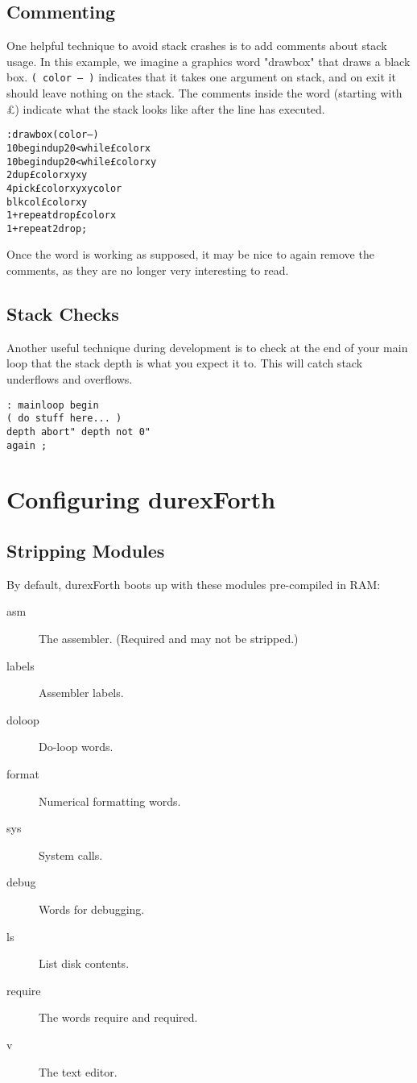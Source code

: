 \subsection{Commenting}

One helpful technique to avoid stack crashes is to add comments about stack usage.
In this example, we imagine a graphics word "drawbox" that draws a black box.
\texttt{( color -- )} indicates that it takes one argument on stack, and on exit it should
leave nothing on the stack. The comments inside the word (starting with \pounds) indicate what the stack
looks like after the line has executed.

\begin{alltt}
: drawbox ( color -- )
10 begin dup 20 < while \pounds color x
10 begin dup 20 < while \pounds color x y
2dup \pounds color x y x y
4 pick \pounds color x y x y color
blkcol \pounds color x y
1+ repeat drop \pounds color x
1+ repeat 2drop ;
\end{alltt}

Once the word is working as supposed, it may be nice to again remove the comments, as
they are no longer very interesting to read.

\subsection{Stack Checks}

Another useful technique during development is to check at the end of your main loop
that the stack depth is what you expect it to. This will catch stack underflows
and overflows.

\begin{verbatim}
: mainloop begin
( do stuff here... )
depth abort" depth not 0"
again ;
\end{verbatim}

\section{Configuring durexForth}

\subsection{Stripping Modules}

By default, durexForth boots up with these modules pre-compiled in RAM:

\begin{description}
    \item[asm] The assembler. (Required and may not be stripped.)
    \item[labels] Assembler labels.
    \item[doloop] Do-loop words.
    \item[format] Numerical formatting words.
    \item[sys] System calls.
    \item[debug] Words for debugging.
    \item[ls] List disk contents.
    \item[require] The words require and required.
    \item[v] The text editor.
\end{description}

